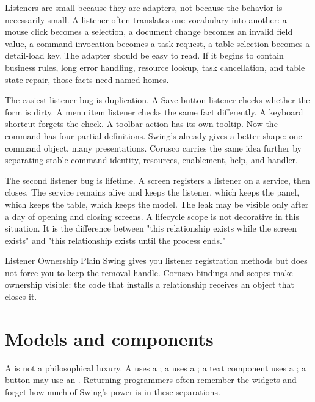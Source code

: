 Listeners are small because they are adapters, not because the behavior is necessarily small. A listener often translates one vocabulary into another: a mouse click becomes a selection, a document change becomes an invalid field value, a command invocation becomes a task request, a table selection becomes a detail-load key. The adapter should be easy to read. If it begins to contain business rules, long error handling, resource lookup, task cancellation, and table state repair, those facts need named homes.

The easiest listener bug is duplication. A Save button listener checks whether the form is dirty. A menu item listener checks the same fact differently. A keyboard shortcut forgets the check. A toolbar action has its own tooltip. Now the command has four partial definitions. Swing's  already gives a better shape: one command object, many presentations. Corusco carries the same idea further by separating stable command identity, resources, enablement, help, and handler.

The second listener bug is lifetime. A screen registers a listener on a service, then closes. The service remains alive and keeps the listener, which keeps the panel, which keeps the table, which keeps the model. The leak may be visible only after a day of opening and closing screens. A lifecycle scope is not decorative in this situation. It is the difference between "this relationship exists while the screen exists" and "this relationship exists until the process ends."

\begin{migrationbox}{Listener Ownership}
Plain Swing gives you listener registration methods but does not force you to keep the removal handle. Corusco bindings and scopes make ownership visible: the code that installs a relationship receives an object that closes it.
\end{migrationbox}

\section{Models and components}

A  is not a philosophical luxury. A  uses a ; a  uses a ; a text component uses a ; a button may use an . Returning programmers often remember the widgets and forget how much of Swing's power is in these separations.

